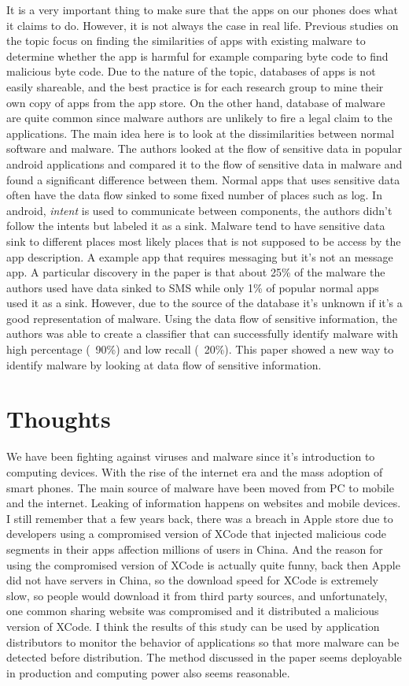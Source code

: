 \documentclass[sigconf]{acmart}
\begin{document}
It is a very important thing to make sure that the apps on our phones does what it claims to do. However, it is not always the case in real life. Previous studies on the topic focus on finding the similarities of apps with existing malware to determine whether the app is harmful for example comparing byte code to find malicious byte code. Due to the nature of the topic, databases of apps is not easily shareable, and the best practice is for each research group to mine their own copy of apps from the app store. On the other hand, database of malware are quite common since malware authors are unlikely to fire a legal claim to the applications. The main idea here is to look at the dissimilarities between normal software and malware. The authors looked at the flow of sensitive data in popular android applications and compared it to the flow of sensitive data in malware and found a significant difference between them. Normal apps that uses sensitive data often have the data flow sinked to some fixed number of places such as log. In android, {\it intent} is used to communicate between components, the authors didn't follow the intents but labeled it as a sink. Malware tend to have sensitive data sink to different places most likely places that is not supposed to be access by the app description. A example app that requires messaging but it's not an message app. A particular discovery in the paper is that about 25\% of the malware the authors used have data sinked to SMS while only 1\% of popular normal apps used it as a sink. However, due to the source of the database it's unknown if it's a good representation of malware. Using the data flow of sensitive information, the authors was able to create a classifier that can successfully identify malware with high percentage (~90\%) and low recall (~20\%). This paper showed a new way to identify malware by looking at data flow of sensitive information. 


\section{Thoughts}

We have been fighting against viruses and malware since it's introduction to computing devices. With the rise of the internet era and the mass adoption of smart phones. The main source of malware have been moved from PC to mobile and the internet. Leaking of information happens on websites and mobile devices. I still remember that a few years back, there was a breach in Apple store due to developers using a compromised version of XCode that injected malicious code segments in their apps affection millions of users in China. And the reason for using the compromised version of XCode is actually quite funny, back then Apple did not have servers in China, so the download speed for XCode is extremely slow, so people would download it from third party sources, and unfortunately, one common sharing website was compromised and it distributed a malicious version of XCode. I think the results of this study can be used by application distributors to monitor the behavior of applications so that more malware can be detected before distribution. The method discussed in the paper seems deployable in production and computing power also seems reasonable. 
\end{document}
